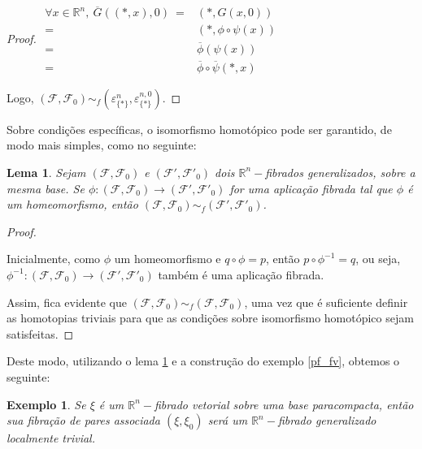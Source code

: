 \documentclass[12pt,oneside]{book} %
\newtheorem{ex}     {\hspace{0.5cm}Exemplo}[chapter]
\newtheorem{lem}    {\hspace{0.5cm}Lema}[chapter]
\newcommand{\R}{\mathbb{R}}
\begin{document}
\begin{proof}
	$\begin{array}{rl}
		\forall x\in \R^{n}, \ \overline{G}((*,x),0) \ = & (*,G(x,0)) \\
		= & (*,\phi\circ\psi(x)) \\
		= & \overline{\phi}(\psi(x)) \\
		= & \overline{\phi}\circ\overline{\psi}(*,x)
	\end{array}$ \newline 
	
	\par Logo, $(\mathcal{F},\mathcal{F}_{0})\sim_{f}(\varepsilon^{n}_{\{ * \}},\varepsilon^{n,0}_{\{ * \}})$.
	
\end{proof}

\par Sobre condições específicas, o isomorfismo homotópico pode ser garantido, de modo mais simples, como no seguinte:

\begin{lem}\label{iso_homot}
	Sejam $(\mathcal{F},\mathcal{F}_{0})$ e $(\mathcal{F'},\mathcal{F'}_{0})$ dois $\R^{n}-$fibrados generalizados, sobre a mesma base. Se $\phi:(\mathcal{F},\mathcal{F}_{0})\to (\mathcal{F'},\mathcal{F'}_{0})$ for uma aplicação fibrada tal que $\phi$ é um homeomorfismo, então $(\mathcal{F},\mathcal{F}_{0})\sim_{f} (\mathcal{F'},\mathcal{F'}_{0})$.
\end{lem}
\begin{proof}
	
	\
	
	\par Inicialmente, como $\phi$ um homeomorfismo e $q\circ\phi=p$, então $p\circ\phi^{-1}=q$, ou seja, $\phi^{-1}:(\mathcal{F},\mathcal{F}_{0})\to (\mathcal{F'},\mathcal{F'}_{0})$ também é uma aplicação fibrada.
	
	\par Assim, fica evidente que $(\mathcal{F},\mathcal{F}_{0})\sim_{f} (\mathcal{F},\mathcal{F}_{0})$, uma vez que é suficiente definir as homotopias triviais para que as condições sobre isomorfismo homotópico sejam satisfeitas.
	
\end{proof}

\par Deste modo, utilizando o lema \ref{iso_homot} e a construção do exemplo \ref{pf_fv}, obtemos o seguinte:

\begin{ex}\label{fht_fv}
	Se $\xi$ é um $\R^{n}-$fibrado vetorial sobre uma base paracompacta, então sua fibração de pares associada $(\xi,\xi_{0})$ será um $\R^{n}-$fibrado generalizado localmente trivial.
\end{ex}
\end{document}
